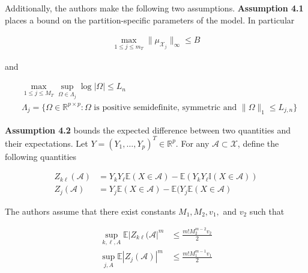 \documentclass[12pt]{article}
\begin{document}
Additionally, the authors make the following two
assumptions. \textbf{Assumption 4.1} places a bound on the
partition-specific parameters of the model. In particular

\begin{align}
  \max_{1\le j\le m_T} \|\mu_{\mathcal{X}_j}\|_\infty \le B
\end{align}

and

\begin{align}
  &\max_{1 \le j \le M_T} \sup_{\Omega \in \Lambda_j} \log |\Omega| \le L_n \\
  &\Lambda_j = \{\Omega \in \mathbb{R}^{p \times p} :
  \Omega \text{ is positive semidefinite, symmetric and } \|\Omega\|_1 \le L_{j,n}
  \}
\end{align}

\textbf{Assumption 4.2} bounds the expected difference between two
quantities and their expectations. Let $Y = (Y_1, \ldots, Y_p)^T \in
\mathbb{R}^p$. For any $\mathcal{A} \subset \mathcal{X}$, define the
following quantities

\begin{align}
  Z_{k\ell}(\mathcal{A}) &=
  Y_k Y_\ell \mathbb{E}(X \in \mathcal{A}) - \mathbb{E}(Y_k Y_\ell \mathbb{I}(X \in \mathcal{A})) \\
  Z_{j}(\mathcal{A}) &=
  Y_j \mathbb{E}(X \in \mathcal{A}) - \mathbb{E}(Y_j \mathbb{E}(X \in \mathcal{A})
\end{align}

The authors assume that there exist constants $M_1, M_2, v_1,$ and
$v_2$ such that

\begin{align}
  \sup_{k,\ell, A} \mathbb{E} | Z_{k\ell}(\mathcal{A}|^m &\le \frac{m! M_2^{m-2} v_2}{2} \\
  \sup_{j, A} \mathbb{E} | Z_j(\mathcal{A}) |^m &\le \frac{m! M_1^{m-1} v_1}{2}
\end{align}



%



\end{document}
